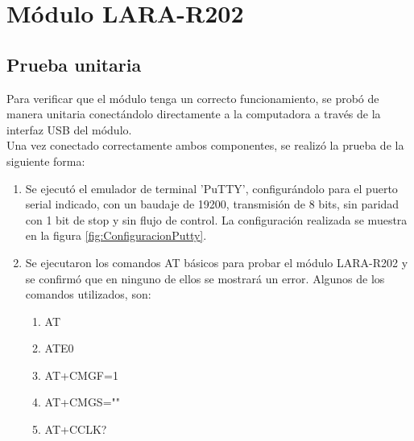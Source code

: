 \section{Módulo LARA-R202}
\subsection{Prueba unitaria}
Para verificar que el módulo tenga un correcto funcionamiento, se probó de manera unitaria conectándolo directamente a la computadora a través de la interfaz USB del módulo.\\ %
%
	
Una vez conectado correctamente ambos componentes, se realizó la prueba de la siguiente forma:
\begin{enumerate}
	\item Se ejecutó el emulador de terminal ’PuTTY’, configurándolo para el puerto serial
	indicado, con un baudaje de 19200, transmisión de 8 bits, sin paridad con 1 bit de
	stop y sin flujo de control. La configuración realizada se muestra en la figura \ref{fig:ConfiguracionPutty}.
	\item Se ejecutaron los comandos AT básicos para probar el módulo LARA-R202 y se confirmó que en ninguno de ellos se mostrará un error. Algunos de los comandos utilizados, son:

		\begin{enumerate}
			\item AT
			\item ATE0
			\item AT+CMGF=1
			\item AT+CMGS=""
			\item AT+CCLK?
		\end{enumerate}	
\end{enumerate}
 
